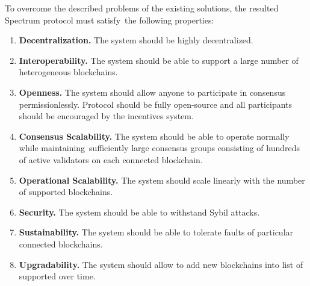 To overcome the described problems of the existing solutions, the resulted Spectrum protocol must satisfy\
the following properties:

\begin{enumerate}
    \item \textbf{Decentralization.} The system should be highly decentralized.
    \item \textbf{Interoperability.} The system should be able to support a large number of heterogeneous blockchains.
    \item \textbf{Openness.} The system should allow anyone to participate in consensus permissionlessly.
    Protocol should be fully open-source and all participants should be encouraged by the incentives system.
    \item \textbf{Consensus Scalability.} The system should be able to operate normally while maintaining\
    sufficiently large consensus groups consisting of hundreds of active validators on each connected blockchain.
    \item \textbf{Operational Scalability.} The system should scale linearly with the number of supported blockchains.
    \item \textbf{Security.} The system should be able to withstand Sybil attacks.
    \item \textbf{Sustainability.} The system should be able to tolerate faults of particular connected blockchains.
    \item \textbf{Upgradability.} The system should allow to add new blockchains into list of supported over time.
\end{enumerate}